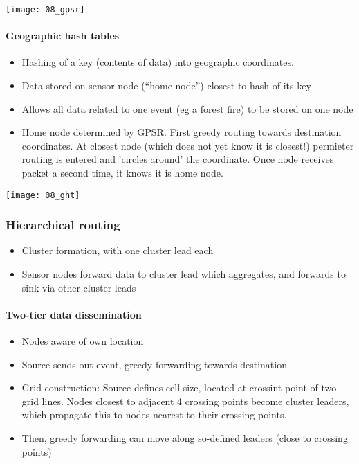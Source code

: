 \texttt{[image: 08\_gpsr]}

\paragraph{Geographic hash tables}

\begin{itemize}
		\item Hashing of a key (contents of data) into geographic coordinates.
		\item Data stored on sensor node (``home node'') closest to hash of its key
		\item Allows all data related to one event (eg a forest fire) to be stored on one node
		\item Home node determined by GPSR. First greedy routing towards
				destination coordinates. At closest node (which does not yet
				know it is closest!) permieter routing is entered and 'circles
				around' the coordinate. Once node receives packet a second
				time, it knows it is home node.
\end{itemize}

\texttt{[image: 08\_ght]}

\subsubsection{Hierarchical routing}

\begin{itemize}
		\item Cluster formation, with one cluster lead each
		\item Sensor nodes forward data to cluster lead which aggregates, and
				forwards to sink via other cluster leads
\end{itemize}

\paragraph{Two-tier data dissemination}

\begin{itemize}
		\item Nodes aware of own location
		\item Source sends out event, greedy forwarding towards destination
		\item Grid construction: Source defines cell size, located at crossint
				point of two grid lines. Nodes closest to adjacent 4 crossing
				points become cluster leaders, which propagate this to nodes
				nearest to their crossing points.
		\item Then, greedy forwarding can move along so-defined leaders (close
				to crossing points)
\end{itemize}

